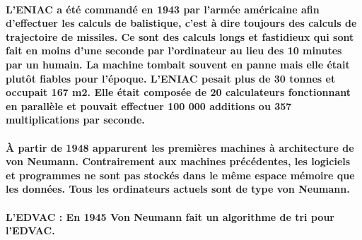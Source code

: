 \paragraph{
  L'ENIAC a été commandé en 1943 par l'armée américaine afin d'effectuer les calculs de balistique, c'est à dire toujours des calculs de trajectoire de missiles. Ce sont des calculs longs et fastidieux qui sont fait en moins d'une seconde par l'ordinateur au lieu des 10 minutes par un humain. La machine tombait souvent en panne mais elle était plutôt fiables pour l'époque. L'ENIAC pesait plus de 30 tonnes  et occupait 167 m2. Elle était composée de 20 calculateurs fonctionnant en parallèle et pouvait effectuer 100 000 additions ou 357 multiplications par seconde.
}

\paragraph{
  À partir de 1948 apparurent les premières machines à architecture de von Neumann. Contrairement aux machines précédentes, les logiciels et programmes ne sont pas stockés dans le même espace mémoire que les données. Tous les ordinateurs actuels sont de type von Neumann.
}

\paragraph{
  L'EDVAC : En 1945 Von Neumann fait un algorithme de tri pour l'EDVAC.
}
